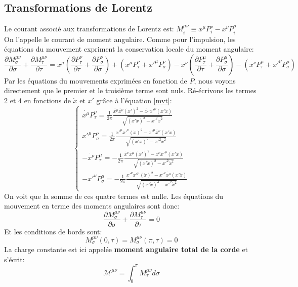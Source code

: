 \documentclass[a4paper,12pt]{article}
\def\xmu{x^\mu}
\begin{document}
\subsection{Transformations de Lorentz}
Le courant associé aux transformations de Lorentz est:
$M_{i}^{\mu\nu}\equiv x^{\mu}P^{\nu}_{i}-x^{\nu}P^{\mu}_{i}$\\
On l'appelle le courant de moment angulaire.
Comme pour l'impulsion, les équations du mouvement expriment la conservation locale du moment angulaire:
$$\frac{\partial M_{\sigma}^{\mu\nu}}{\partial \sigma}+\frac{\partial M_{\tau}^{\mu\nu}}{\partial \tau}=x^{\mu}\left( \frac{\partial P^{\nu}_{\tau}}{\partial \tau}+\frac{\partial P^{\nu}_{\sigma}}{\partial \sigma}\right) +\left( \dot{x^{\mu}}P^{\nu}_{\tau}+x'^{\mu}P^{\nu}_{\sigma}\right) -x^{\nu}\left( \frac{\partial P^{\mu}_{\tau}}{\partial \tau}+\frac{\partial P^{\mu}_{\sigma}}{\partial \sigma}\right) -\left( \dot{x^{\nu}}P^{\mu}_{\tau}+x'^{\nu}P^{\mu}_{\sigma}\right)$$
Par les équations du mouvements exprimées en fonction de $P$, nous voyons directement que le premier et le troisième terme sont nuls. 
Ré-écrivons les termes 2 et 4 en fonctions de $\dot{x}$ et $x'$ grâce à l'équation \eqref{mvt}:
\begin{equation}
	\left\lbrace
	\begin{aligned}
	\dot{x^{\mu}}P^{\nu}_{\tau}=\frac{1}{2\pi}\frac{\dot{\xmu}\dot{x^\nu}(x')^2-\dot{\xmu}x'^\nu(x'\dot{x})}{\sqrt{(x'\dot{x})^2-x'^2\dot{x}^2}}\\
	x'^{\mu}P^{\nu}_{\sigma}=\frac{1}{2\pi}\frac{x'^\mu x'^\nu (\dot{x})^2-x'^{\mu}\dot{x^\nu}(x'\dot{x})}{\sqrt{(x'\dot{x})^2-x'^2\dot{x}^2}}\\
	-\dot{x^{\nu}}P^{\mu}_{\tau}=-\frac{1}{2\pi}\frac{\dot{x^\nu}\dot{\xmu}(x')^2-\dot{x^\nu}x'^\mu(x'\dot{x})}{\sqrt{(x'\dot{x})^2-x'^2\dot{x}^2}}\\
	-x'^{\nu}P^{\mu}_{\sigma}=-\frac{1}{2\pi}\frac{x'^{\nu}x'^\mu (\dot{x})^2-x'^{\nu}\dot{\xmu}(x'\dot{x})}{\sqrt{(x'\dot{x})^2-x'^2\dot{x}^2}}
	\end{aligned}
	\right.
\end{equation}
On voit que la somme de ces quatre termes est nulle. 
Les équations du mouvement en terme des moments angulaires sont donc:
$$\frac{\partial M_{\sigma}^{\mu\nu}}{\partial \sigma}+\frac{\partial M_{\tau}^{\mu\nu}}{\partial \tau}=0$$
Et les conditions de bords sont:
$$M_{\sigma}^{\mu\nu}(0,\tau)=M_{\sigma}^{\mu\nu}(\pi,\tau)=0$$
La charge constante est ici appelée \textbf{moment angulaire total de la corde} et s'écrit: 
$$\mathcal{M^{\mu\nu}}=\int_{0}^{\pi}M^{\mu\nu}_{\tau}d\sigma$$
\end{document}
